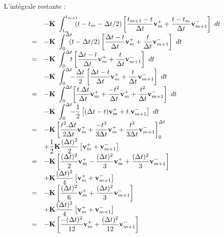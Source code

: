 \documentclass[12pt,a4paper]{report}
\begin{document}
L'intégrale restante :
\begin{equation}
\begin{array}{r l}
	  &\displaystyle	    
	    -\mathbf{K}~\int_{t_m}^{t_{m+1}} \!\!\! 	
		(t-t_m-\Delta t/2) \left[
			\frac{t_{m+1}-t}{\Delta t} \mathbf{v}_m^+ + 
			\frac{t-t_m}{\Delta t} \mathbf{v}_{m+1}^- 
			\right] ~dt
	\\
	 =&\displaystyle	    
	    -\mathbf{K}~\int_{0}^{\Delta t} \!\!\! 	
		(t-\Delta t/2) \left[
			\frac{\Delta t - t}{\Delta t} \mathbf{v}_m^+ + 
			\frac{t}{\Delta t} \mathbf{v}_{m+1}^- 
			\right] ~dt
	\\
	=&\displaystyle	    
		    -\mathbf{K}~\int_{0}^{\Delta t} \!\!\! 	
			t \left[
				\frac{\Delta t - t}{\Delta t} \mathbf{v}_m^+ + 
				\frac{t}{\Delta t} \mathbf{v}_{m+1}^- 
				\right] ~dt
		\\
		 &\displaystyle	    
		    -\mathbf{K}~\int_{0}^{\Delta t} \!\!\! 	
			- \frac{\Delta t}{2} \left[
				\frac{\Delta t - t}{\Delta t} \mathbf{v}_m^+ + 
				\frac{t}{\Delta t} \mathbf{v}_{m+1}^- 
				\right] ~dt
	\\
	=&\displaystyle	    
		    -\mathbf{K}~\int_{0}^{\Delta t} \!	
			\left[
				\frac{t.\Delta t}{\Delta t} \mathbf{v}_m^+  
				+\frac{-t^2}{\Delta t} \mathbf{v}_m^+  
				+\frac{t^2}{\Delta t} \mathbf{v}_{m+1}^- 
			\right] ~dt
		\\
		 &\displaystyle	    
		    -\mathbf{K}~\int_{0}^{\Delta t} \!\!\! 	
			- \frac{1}{2} \left[
				(\Delta t - t) \mathbf{v}_m^+ + 
				t. \mathbf{v}_{m+1}^- 
				\right] ~dt
	\\
	=&\displaystyle	    
	    -\mathbf{K}
		\left[
			\frac{t^2.\Delta t}{2 \Delta t} \mathbf{v}_m^+  
			+\frac{-t^3}{3 \Delta t} \mathbf{v}_m^+  
			+\frac{t^3}{3 \Delta t} \mathbf{v}_{m+1}^- 
		\right]_{0}^{\Delta t} 
		\\
		 &\displaystyle	    
		    + \frac{1}{2} \mathbf{K} \frac{(\Delta t)^2}{2}
			 \left[
				\mathbf{v}_m^+ + \mathbf{v}_{m+1}^- 
			\right] 
	\\
	=&\displaystyle	    
	    -\mathbf{K}
		\left[
			\frac{(\Delta t)^2}{2} \mathbf{v}_m^+  
			-\frac{(\Delta t)^2}{3} \mathbf{v}_m^+  
			+\frac{(\Delta t)^2}{3} \mathbf{v}_{m+1}^- 
		\right]
		\\
		 &\displaystyle	    
		    + \mathbf{K} \frac{(\Delta t)^2}{4}
			 \left[
				\mathbf{v}_m^+ + \mathbf{v}_{m+1}^- 
			\right]  
	\\
	=&\displaystyle	    
	    -\mathbf{K}
		\left[
			\frac{(\Delta t)^2}{6} \mathbf{v}_m^+  
			+\frac{(\Delta t)^2}{3} \mathbf{v}_{m+1}^- 
		\right]
		\\
		 &\displaystyle	    
		    + \mathbf{K} \frac{(\Delta t)^2}{4}
			 \left[
				\mathbf{v}_m^+ + \mathbf{v}_{m+1}^- 
			\right]  
	\\
	=&\displaystyle	    
	    -\mathbf{K}
		\left[
			\frac{-(\Delta t)^2}{12} \mathbf{v}_m^+ 
			+\frac{(\Delta t)^2}{12} \mathbf{v}_{m+1}^- 
		\right]
\end{array}
\end{equation}
\end{document}
